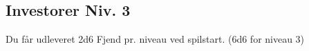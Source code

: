 \subsection{Investorer Niv. 3}
Du får udleveret 2d6 Fjend pr. niveau ved spilstart. (6d6 for niveau 3)\\